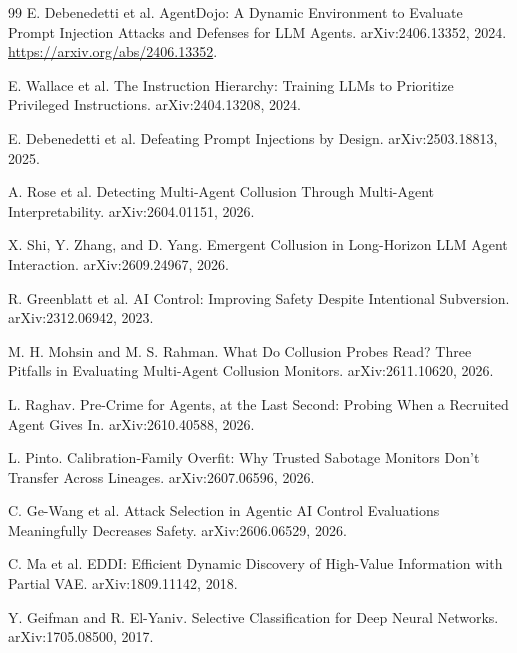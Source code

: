 \clearpage
\begin{thebibliography}{99}
E. Debenedetti et al.
\newblock AgentDojo: A Dynamic Environment to Evaluate Prompt Injection Attacks and Defenses for LLM Agents.
\newblock arXiv:2406.13352, 2024.
\url{https://arxiv.org/abs/2406.13352}.

E. Wallace et al.
\newblock The Instruction Hierarchy: Training LLMs to Prioritize Privileged Instructions.
\newblock arXiv:2404.13208, 2024.

E. Debenedetti et al.
\newblock Defeating Prompt Injections by Design.
\newblock arXiv:2503.18813, 2025.

A. Rose et al.
\newblock Detecting Multi-Agent Collusion Through Multi-Agent Interpretability.
\newblock arXiv:2604.01151, 2026.

X. Shi, Y. Zhang, and D. Yang.
\newblock Emergent Collusion in Long-Horizon LLM Agent Interaction.
\newblock arXiv:2609.24967, 2026.

R. Greenblatt et al.
\newblock AI Control: Improving Safety Despite Intentional Subversion.
\newblock arXiv:2312.06942, 2023.

M. H. Mohsin and M. S. Rahman.
\newblock What Do Collusion Probes Read? Three Pitfalls in Evaluating Multi-Agent Collusion Monitors.
\newblock arXiv:2611.10620, 2026.

L. Raghav.
\newblock Pre-Crime for Agents, at the Last Second: Probing When a Recruited Agent Gives In.
\newblock arXiv:2610.40588, 2026.

L. Pinto.
\newblock Calibration-Family Overfit: Why Trusted Sabotage Monitors Don't Transfer Across Lineages.
\newblock arXiv:2607.06596, 2026.

C. Ge-Wang et al.
\newblock Attack Selection in Agentic AI Control Evaluations Meaningfully Decreases Safety.
\newblock arXiv:2606.06529, 2026.

C. Ma et al.
\newblock EDDI: Efficient Dynamic Discovery of High-Value Information with Partial VAE.
\newblock arXiv:1809.11142, 2018.

Y. Geifman and R. El-Yaniv.
\newblock Selective Classification for Deep Neural Networks.
\newblock arXiv:1705.08500, 2017.


\end{thebibliography}
